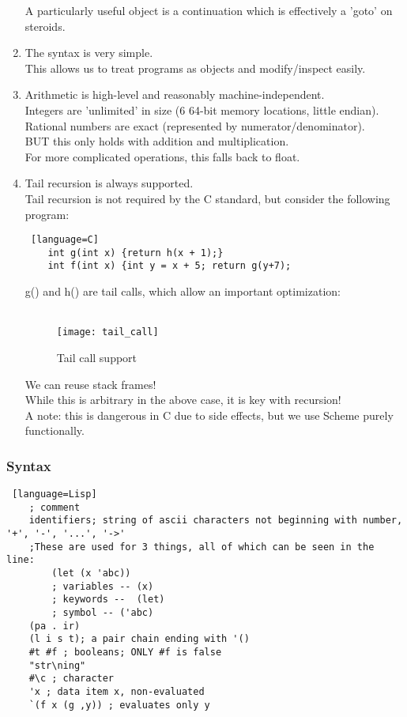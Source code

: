 \documentclass[../../lecture_notes.tex]{subfiles}
\begin{document}
\begin{enumerate}
		A particularly useful object is a continuation which is effectively a 'goto' on steroids.
	\item The syntax is very simple.\\
		This allows us to treat programs as objects and modify/inspect easily.
	\item Arithmetic is high-level and reasonably machine-independent.\\
		Integers are 'unlimited' in size (6 64-bit memory locations, little endian).\\
		Rational numbers are exact (represented by numerator/denominator).\\
		BUT this only holds with addition and multiplication.\\
		For more complicated operations, this falls back to float.\\
	\item Tail recursion is always supported.\\
		Tail recursion is not required by the C standard, but consider the following program:\\
		\begin{lstlisting} [language=C]
	int g(int x) {return h(x + 1);}
	int f(int x) {int y = x + 5; return g(y+7);
		\end{lstlisting}
		g() and h() are tail calls, which allow an important optimization:\\\

		\begin{figure}[H]
			\centering
			\texttt{[image: tail\_call]}
			\caption{Tail call support}
			\label{fig:test}
		\end{figure}
		
		We can reuse stack frames!\\
		While this is arbitrary in the above case, it is key with recursion!\\
		A note: this is dangerous in C due to side effects, but we use Scheme purely functionally.
\end{enumerate}

\subsubsection*{Syntax}
\begin{lstlisting} [language=Lisp]
	; comment
	identifiers; string of ascii characters not beginning with number, '+', '-', '...', '->'
	;These are used for 3 things, all of which can be seen in the line:
		(let (x 'abc))
		; variables -- (x)
		; keywords --  (let)
		; symbol -- ('abc)
	(pa . ir)
	(l i s t); a pair chain ending with '() 
	#t #f ; booleans; ONLY #f is false
	"str\ning"
	#\c ; character
	'x ; data item x, non-evaluated
	`(f x (g ,y)) ; evaluates only y
\end{lstlisting}
\end{document}
